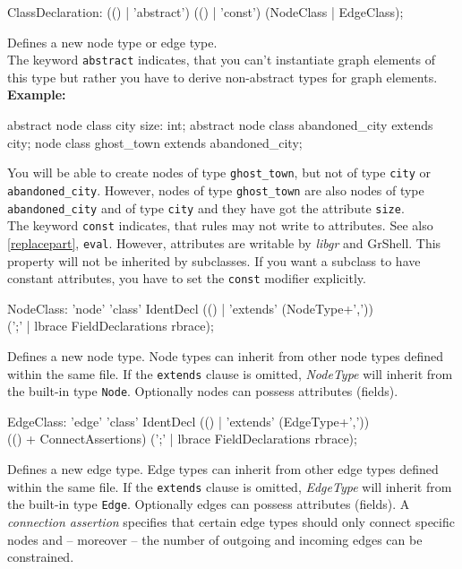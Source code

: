 \begin{rail}  
  ClassDeclaration: (() | 'abstract') (() | 'const') (NodeClass | EdgeClass);
\end{rail}
Defines a new node type or edge type.\\
The keyword \texttt{abstract} indicates, that you can't instantiate graph elements of this type but rather you have to derive non-abstract types for graph elements. \\
{\small \textbf{Example:}}
\begin{grgen}
abstract node class city {
	size: int;
}
abstract node class abandoned_city extends city;
node class ghost_town extends abandoned_city;
\end{grgen}
{\small You will be able to create nodes of type \texttt{ghost\_town}, but not of type \texttt{city} or \texttt{abandoned\_city}. However, nodes of type \texttt{ghost\_town} are also nodes of type \texttt{abandoned\_city} and of type \texttt{city} and they have got the attribute \texttt{size}}.\\
The keyword \texttt{const} indicates, that rules may not write to attributes. See also \ref{replacepart}, \texttt{eval}. However, attributes are writable by \emph{libgr} and GrShell. This property will not be inherited by subclasses. If you want a subclass to have constant attributes, you have to set the \texttt{const} modifier explicitly.

\begin{rail}  
  NodeClass: 'node' 'class' IdentDecl (() | 'extends' (NodeType+',')) \\ 
    (';' | lbrace FieldDeclarations rbrace);
\end{rail}
Defines a new node type. Node types can inherit from other node types defined within the same file. If the \texttt{extends} clause is omitted, \emph{NodeType} will inherit from the built-in type \texttt{Node}. Optionally nodes can possess attributes (fields).

\begin{rail}    
  EdgeClass: 'edge' 'class' IdentDecl (() | 'extends' (EdgeType+',')) \\
    (() + ConnectAssertions) (';' | lbrace FieldDeclarations rbrace);
\end{rail}
Defines a new edge type. Edge types can inherit from other edge types defined within the same file. If the \texttt{extends} clause is omitted, \emph{EdgeType} will inherit from the built-in type \texttt{Edge}. Optionally edges can possess attributes (fields). A \emph{connection assertion} specifies that certain edge types should only connect specific nodes and -- moreover -- the number of outgoing and incoming edges can be constrained.

